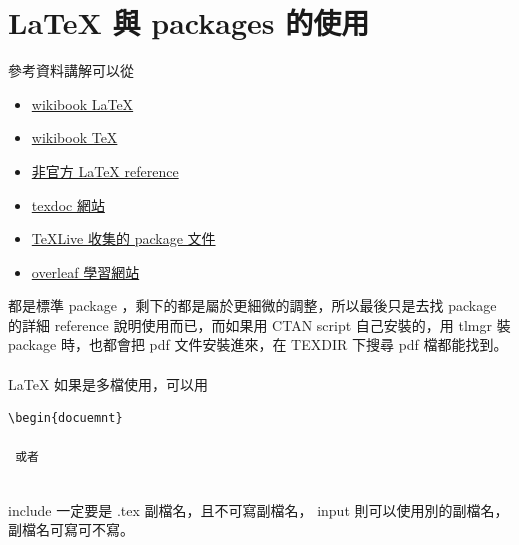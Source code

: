 \chapter{\LaTeX{} 與 packages 的使用}
參考資料講解可以從
\begin{itemize}
  \item \href{https://en.wikibooks.org/wiki/LaTeX}{wikibook \LaTeX{}}
  \item \href{https://en.wikibooks.org/wiki/TeX}{wikibook \TeX{}}
  \item \href{https://latexref.xyz}{非官方 \LaTeX{} reference}
  \item \href{https://texdoc.org}{texdoc 網站}
  \item \href{https://www.tug.org/texlive/devsrc/Master/doc.html}
    {TeXLive 收集的 package 文件}
  \item \href{https://www.overleaf.com/learn}{overleaf 學習網站}
\end{itemize}
都是標準 package ，剩下的都是屬於更細微的調整，所以最後只是去找 package
的詳細 reference 說明使用而已，而如果用 CTAN script 自己安裝的，用 tlmgr
裝 package 時，也都會把 pdf 文件安裝進來，在 TEXDIR 下搜尋 pdf 檔都能找到。
\\\\
{\LaTeX} 如果是多檔使用，可以用
\begin{verbatim}
\begin{docuemnt}

 或者


\end{verbatim}
include 一定要是 .tex 副檔名，且不可寫副檔名，
input 則可以使用別的副檔名，副檔名可寫可不寫。

